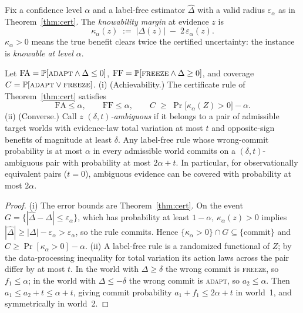 
\begin{definition}\label{def:margin}
Fix a confidence level $\alpha$ and a label-free estimator $\widehat\Delta$ with a valid
radius $\varepsilon_\alpha$ as in Theorem~\ref{thm:cert}. The \emph{knowability margin} at
evidence $z$ is
\[
\kappa_\alpha(z)\;:=\;|\Delta(z)|\;-\;2\,\varepsilon_\alpha(z).
\]
$\kappa_\alpha>0$ means the true benefit clears twice the certified uncertainty: the
instance is \emph{knowable at level $\alpha$}.
\end{definition}

\begin{proposition}\label{prop:kfrontier}
Let $\mathrm{FA}=\Pr[\textsc{adapt}\wedge\Delta\le0]$, $\mathrm{FF}=\Pr[\textsc{freeze}\wedge\Delta\ge0]$,
and coverage $C=\Pr[\textsc{adapt}\vee\textsc{freeze}]$.
\textup{(i) (Achievability.)} The certificate rule of Theorem~\ref{thm:cert} satisfies
\[
\mathrm{FA}\le\alpha,\qquad \mathrm{FF}\le\alpha,\qquad
C\;\ge\;\Pr\!\big[\kappa_\alpha(Z)>0\big]-\alpha .
\]
\textup{(ii) (Converse.)} Call $z$ \emph{$(\delta,t)$-ambiguous} if it belongs to a pair of
admissible target worlds with evidence-law total variation at most $t$ and opposite-sign
benefits of magnitude at least $\delta$. Any label-free rule whose wrong-commit
probability is at most $\alpha$ in every admissible world commits on a
$(\delta,t)$-ambiguous pair with probability at most $2\alpha+t$. In particular, for
observationally equivalent pairs ($t=0$), ambiguous evidence can be covered with
probability at most $2\alpha$.
\end{proposition}

\begin{proof}
(i) The error bounds are Theorem~\ref{thm:cert}. On the event
$G=\{|\widehat\Delta-\Delta|\le\varepsilon_\alpha\}$, which has probability at least
$1-\alpha$, $\kappa_\alpha(z)>0$ implies
$|\widehat\Delta|\ge|\Delta|-\varepsilon_\alpha>\varepsilon_\alpha$, so the rule commits.
Hence $\{\kappa_\alpha>0\}\cap G\subseteq\{\text{commit}\}$ and
$C\ge\Pr[\kappa_\alpha>0]-\alpha$.
(ii) A label-free rule is a randomized functional of $Z$; by the data-processing
inequality for total variation its action laws across the pair differ by at most $t$.
In the world with $\Delta\ge\delta$ the wrong commit is \textsc{freeze}, so $f_1\le\alpha$;
in the world with $\Delta\le-\delta$ the wrong commit is \textsc{adapt}, so $a_2\le\alpha$.
Then $a_1\le a_2+t\le\alpha+t$, giving commit probability
$a_1+f_1\le2\alpha+t$ in world~1, and symmetrically in world~2.
\end{proof}

